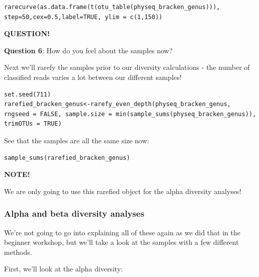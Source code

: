 \documentclass[
]{book}
\newenvironment{bluebox}{
  \definecolor{shadecolor}{RGB}{172, 210, 237}
  \color{white}
  \begin{shaded}}
 {\end{shaded}}
\newenvironment{greenbox}{
  \definecolor{shadecolor}{RGB}{141, 181, 128}
  \color{white}
  \begin{shaded}}
 {\end{shaded}}
\begin{document}
\begin{verbatim}
rarecurve(as.data.frame(t(otu_table(physeq_bracken_genus))), step=50,cex=0.5,label=TRUE, ylim = c(1,150))
\end{verbatim}

\begin{bluebox}

\begin{center}
\textbf{QUESTION!}

\end{center}

\textbf{Question 6}: How do you feel about the samples now?

\end{bluebox}

Next we'll rarefy the samples prior to our diversity calculations - the number of classified reads varies a lot between our different samples!

\begin{verbatim}
set.seed(711)
rarefied_bracken_genus<-rarefy_even_depth(physeq_bracken_genus, rngseed = FALSE, sample.size = min(sample_sums(physeq_bracken_genus)), trimOTUs = TRUE)
\end{verbatim}

See that the samples are all the same size now:

\begin{verbatim}
sample_sums(rarefied_bracken_genus)
\end{verbatim}

\begin{greenbox}

\begin{center}
\textbf{NOTE!}

\end{center}

We are only going to use this rarefied object for the alpha diversity analyses!

\end{greenbox}

\subsubsection{Alpha and beta diversity analyses}\label{alpha-and-beta-diversity-analyses}

We're not going to go into explaining all of these again as we did that in the beginner workshop, but we'll take a look at the samples with a few different methods.

First, we'll look at the alpha diversity:
\end{document}
